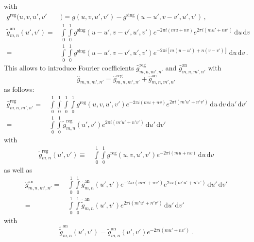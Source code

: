 with
\begin{align}
  g^\mathrm{reg}(u,v,u',v'&)
  = g(u,v,u',v') - g^\mathrm{sing} (u-u',v-v',u',v') \, , \\
  \tilde{g}^\mathrm{an}_{m,n} (u',v')
  =& \int\limits_0^1 \int\limits_0^1
       g^\mathrm{sing} (u-u',v-v',u',v') e^{-2 \pi i (m u + n v)} e^{2 \pi i (m u' + n v')}
     \,\mathrm{d}u \,\mathrm{d}v \nonumber \\
  =& \int\limits_0^1 \int\limits_0^1
       g^\mathrm{sing} (u-u',v-v',u',v') e^{-2 \pi i \left[m (u-u') + n (v-v')\right]}
     \,\mathrm{d}u \,\mathrm{d}v \label{eqn:singular_ft_g} \, .
\end{align}
This allows to introduce Fourier coefficients
$\hat{g}^\textrm{reg}_{m,n,m',n'}$ and $\hat{g}^\textrm{an}_{m,n,m',n'}$ with
\begin{equation}
 \hat{g}_{m,n,m',n'} = \hat{g}^\textrm{reg}_{m,n,m',n'} + \hat{g}^\textrm{an}_{m,n,m',n'}
\end{equation}
as follows:
\begin{align}
 \hat{g}^\textrm{reg}_{m,n,m',n'}
 =&\, \int\limits_0^1 \int\limits_0^1 \int\limits_0^1 \int\limits_0^1
        g^\mathrm{reg}(u,v,u',v') e^{-2 \pi i (m u + n v)} e^{2 \pi i (m' u' + n' v')}
        \,\mathrm{d}u \,\mathrm{d}v \,\mathrm{d}u' \,\mathrm{d}v' \label{eqn:reg_ft_g} \\
 =&\, \int\limits_0^1 \int\limits_0^1
        \tilde{g}^\textrm{reg}_{m,n}(u',v') e^{2 \pi i (m' u' + n' v')}
        \,\mathrm{d}u' \,\mathrm{d}v'
\end{align}
with
\begin{align}
 \tilde{g}^\textrm{reg}_{m,n}(u',v')
 \equiv&\, \int\limits_0^1 \int\limits_0^1
             g^\textrm{reg}(u,v,u',v') e^{-2 \pi i (m u + n v)}
             \,\mathrm{d}u \,\mathrm{d}v
\end{align}
as well as
\begin{align}
 \hat{g}^\textrm{an}_{m,n,m',n'}
 =&\, \int\limits_0^1 \int\limits_0^1
        \tilde{g}^\mathrm{an}_{m,n}(u',v') e^{-2 \pi i (m u' + n v')} e^{2 \pi i (m' u' + n' v')}
        \,\mathrm{d}u' \,\mathrm{d}v' \label{eqn:ft_g_an} \\
 =&\, \int\limits_0^1 \int\limits_0^1
        \tilde{\tilde{g}}^\mathrm{an}_{m,n}(u',v') e^{2 \pi i (m' u' + n' v')}
        \,\mathrm{d}u' \,\mathrm{d}v'
\end{align}
with
\begin{equation}
 \tilde{\tilde{g}}^\mathrm{an}_{m,n}(u',v')
 = \tilde{g}^\mathrm{an}_{m,n}(u',v') e^{-2 \pi i (m u' + n v')} \label{eqn:tt_g} \, .
\end{equation}
